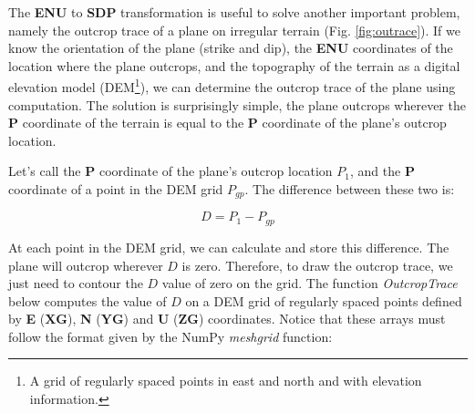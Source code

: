 \documentclass[a4paper , 12pt]{book}
\begin{document}
The \textbf{ENU} to \textbf{SDP} transformation is useful to solve another important problem, namely the outcrop trace of a plane on irregular terrain (Fig. \ref{fig:outrace}). If we know the orientation of the plane (strike and dip), the \textbf{ENU} coordinates of the location where the plane outcrops, and the topography of the terrain as a digital elevation model (DEM\footnote{A grid of regularly spaced points in east and north and with elevation information.}), we can determine the outcrop trace of the plane using computation. The solution is surprisingly simple, the plane outcrops wherever the \textbf{P} coordinate of the terrain is equal to the \textbf{P} coordinate of the plane's outcrop location.

Let's call the \textbf{P} coordinate of the plane's outcrop location $P_1$, and the \textbf{P} coordinate of a point in the DEM grid $P_{gp}$. The difference between these two is:

\begin{equation}
    D=P_1-P_{gp}
\end{equation}

At each point in the DEM grid, we can calculate and store this difference. The plane will outcrop wherever $D$ is zero. Therefore, to draw the outcrop trace, we just need to contour the $D$ value of zero on the grid. The function \textit{OutcropTrace} below computes the value of $D$ on a DEM grid of regularly spaced points defined by \textbf{E} ($\mathbf{XG}$), \textbf{N} ($\mathbf{YG}$) and \textbf{U} ($\mathbf{ZG}$) coordinates. Notice that these arrays must follow the format given by the NumPy \textit{meshgrid} function:
\end{document}
